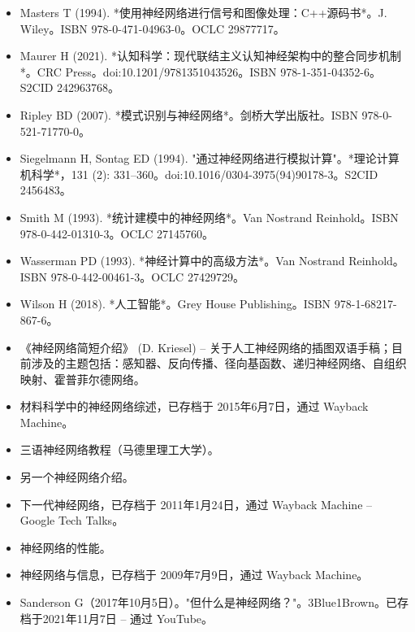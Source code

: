 \begin{itemize}
\item Masters T (1994). *使用神经网络进行信号和图像处理：C++源码书*。J. Wiley。ISBN 978-0-471-04963-0。OCLC 29877717。  
\item Maurer H (2021). *认知科学：现代联结主义认知神经架构中的整合同步机制*。CRC Press。doi:10.1201/9781351043526。ISBN 978-1-351-04352-6。S2CID 242963768。  
\item Ripley BD (2007). *模式识别与神经网络*。剑桥大学出版社。ISBN 978-0-521-71770-0。
\item Siegelmann H, Sontag ED (1994). "通过神经网络进行模拟计算"。*理论计算机科学*，131 (2): 331–360。doi:10.1016/0304-3975(94)90178-3。S2CID 2456483。  
\item Smith M (1993). *统计建模中的神经网络*。Van Nostrand Reinhold。ISBN 978-0-442-01310-3。OCLC 27145760。  
\item Wasserman PD (1993). *神经计算中的高级方法*。Van Nostrand Reinhold。ISBN 978-0-442-00461-3。OCLC 27429729。  
\item Wilson H (2018). *人工智能*。Grey House Publishing。ISBN 978-1-68217-867-6。
\end{itemize}

\begin{itemize}
\item 《神经网络简短介绍》 (D. Kriesel) – 关于人工神经网络的插图双语手稿；目前涉及的主题包括：感知器、反向传播、径向基函数、递归神经网络、自组织映射、霍普菲尔德网络。
\item 材料科学中的神经网络综述，已存档于 2015年6月7日，通过 Wayback Machine。
\item 三语神经网络教程（马德里理工大学）。
\item 另一个神经网络介绍。
\item 下一代神经网络，已存档于 2011年1月24日，通过 Wayback Machine – Google Tech Talks。
\item 神经网络的性能。
\item 神经网络与信息，已存档于 2009年7月9日，通过 Wayback Machine。
\item Sanderson G（2017年10月5日）。"但什么是神经网络？"。3Blue1Brown。已存档于2021年11月7日 – 通过 YouTube。
\end{itemize}

